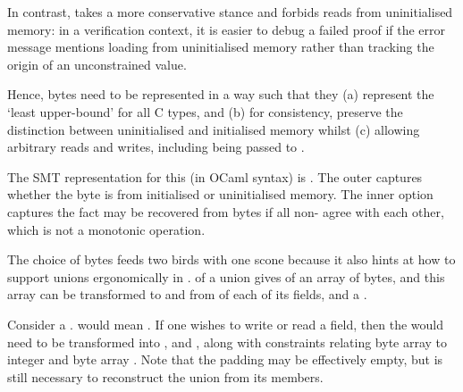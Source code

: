 In contrast,  takes a more conservative stance and forbids reads from
uninitialised memory: in a verification context, it is easier to debug a failed
proof if the error message mentions loading from uninitialised memory rather
than tracking the origin of an unconstrained value.


Hence, bytes need to be represented in a way such that they (a) represent the
`least upper-bound' for all C types, and (b) for consistency, preserve the
distinction between uninitialised and initialised memory whilst (c) allowing
arbitrary reads and writes, including being passed to .

The SMT representation for this (in OCaml syntax) is
. The outer
 captures whether the byte is from initialised or
uninitialised memory. The inner option captures the fact  may be
recovered from bytes if all non-  agree with each
other, which is not a monotonic operation.

The choice of bytes feeds two birds with one scone because it also hints at how
to support unions ergonomically in .  of a union gives
 of an array of bytes, and this array can be transformed to and from
 of each of its fields, and a .

Consider a .
  would mean . %
If one wishes to write or read a field, then the  would need to
be transformed into , and %
 , %
along with constraints relating byte array  to integer 
and byte array . Note that the padding may be effectively empty,
but is still necessary to reconstruct the union from its members.

